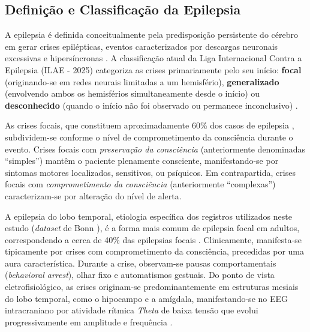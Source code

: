\documentclass[alpha-refs,brazilian]{CC-EC_TF-TC}
\begin{document}
\subsection{Definição e Classificação da Epilepsia}

A epilepsia é definida conceitualmente pela predisposição persistente do cérebro em gerar crises epilépticas, eventos caracterizados por descargas neuronais excessivas e hipersíncronas \citep{Engel2024}. A classificação atual da Liga Internacional Contra a Epilepsia (ILAE - 2025) \citep{Beniczky2025} categoriza as crises primariamente pelo seu início: \textbf{focal} (originando-se em redes neurais limitadas a um hemisfério), \textbf{generalizado} (envolvendo ambos os hemisférios simultaneamente desde o início) ou \textbf{desconhecido} (quando o início não foi observado ou permanece inconclusivo) \citep{epilepsyfoundation_whatis}.

As crises focais, que constituem aproximadamente 60\% dos casos de epilepsia \citep{Engel2024}, subdividem-se conforme o nível de comprometimento da consciência durante o evento. Crises focais com \textit{preservação da consciência} (anteriormente denominadas ``simples'') mantêm o paciente plenamente consciente, manifestando-se por sintomas motores localizados, sensitivos, ou psíquicos. Em contrapartida, crises focais com \textit{comprometimento da consciência} (anteriormente ``complexas'') caracterizam-se por alteração do nível de alerta.

A epilepsia do lobo temporal, etiologia específica dos registros utilizados neste estudo (\textit{dataset} de Bonn \citep{UKB_EEGDataDownload}), é a forma mais comum de epilepsia focal em adultos, correspondendo a cerca de 40\% das epilepsias focais \citep{Engel2024}. Clinicamente, manifesta-se tipicamente por crises com comprometimento da consciência, precedidas por uma aura característica. Durante a crise, observam-se pausas comportamentais (\textit{behavioral arrest}), olhar fixo e automatismos gestuais. Do ponto de vista eletrofisiológico, as crises originam-se predominantemente em estruturas mesiais do lobo temporal, como o hipocampo e a amígdala, manifestando-se no EEG intracraniano por atividade rítmica \textit{Theta} de baixa tensão que evolui progressivamente em amplitude e frequência \citep{Noachtar2021}.
\end{document}
